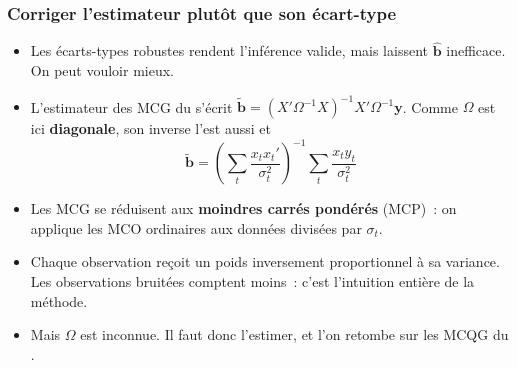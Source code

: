 \documentclass[10pt]{beamer}
\begin{document}
\begin{frame}
  \frametitle{Corriger l'estimateur plutôt que son écart-type}

  \begin{itemize}

  \item Les écarts-types robustes rendent l'inférence valide, mais laissent
    $\hat{\mathbf b}$ inefficace. On peut vouloir mieux.\newline

  \item L'estimateur des MCG du  s'écrit
    $\tilde{\mathbf b} = (X'\Omega^{-1}X)^{-1}X'\Omega^{-1}\mathbf y$. Comme
    $\Omega$ est ici \textbf{diagonale}, son inverse l'est aussi et
    \[
      \tilde{\mathbf b} = \left(\sum_t \frac{x_tx_t'}{\sigma_t^2}\right)^{-1}
      \sum_t \frac{x_ty_t}{\sigma_t^2}
    \]

  \item[$\Rightarrow$] Les MCG se réduisent aux \textbf{moindres carrés
      pondérés} (MCP)~: on applique les MCO ordinaires aux données divisées par
    $\sigma_t$.\newline

  \item Chaque observation reçoit un poids inversement proportionnel à sa
    variance. Les observations bruitées comptent moins~: c'est l'intuition
    entière de la méthode.\newline

  \item[\dbend] Mais $\Omega$ est inconnue. Il faut donc l'estimer, et l'on
    retombe sur les MCQG du .

  \end{itemize}

\end{frame}
\end{document}
